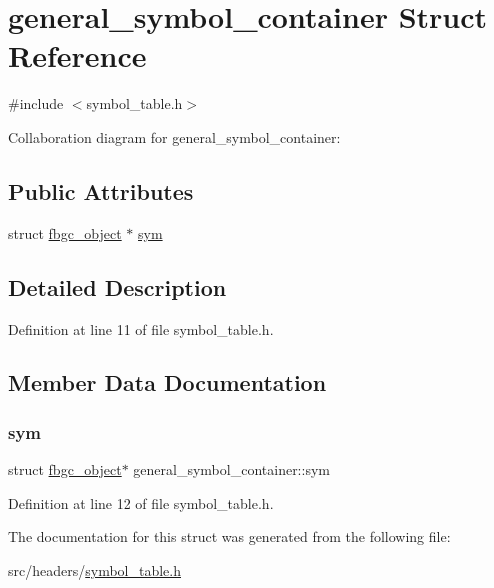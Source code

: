 \hypertarget{structgeneral__symbol__container}{}\section{general\+\_\+symbol\+\_\+container Struct Reference}
\label{structgeneral__symbol__container}


{\ttfamily \#include $<$symbol\+\_\+table.\+h$>$}



Collaboration diagram for general\+\_\+symbol\+\_\+container\+:
\subsection*{Public Attributes}
\begin{DoxyCompactItemize}
\item 
struct \hyperlink{structfbgc__object}{fbgc\+\_\+object} $\ast$ \hyperlink{structgeneral__symbol__container_a6357a19de5269c39b24e01dd711f247a}{sym}
\end{DoxyCompactItemize}


\subsection{Detailed Description}


Definition at line 11 of file symbol\+\_\+table.\+h.



\subsection{Member Data Documentation}
\mbox{\label{structgeneral__symbol__container_a6357a19de5269c39b24e01dd711f247a}} 
\subsubsection{\texorpdfstring{sym}{sym}}
{\footnotesize\ttfamily struct \hyperlink{structfbgc__object}{fbgc\+\_\+object}$\ast$ general\+\_\+symbol\+\_\+container\+::sym}



Definition at line 12 of file symbol\+\_\+table.\+h.



The documentation for this struct was generated from the following file\+:\begin{DoxyCompactItemize}
\item 
src/headers/\hyperlink{symbol__table_8h}{symbol\+\_\+table.\+h}\end{DoxyCompactItemize}
